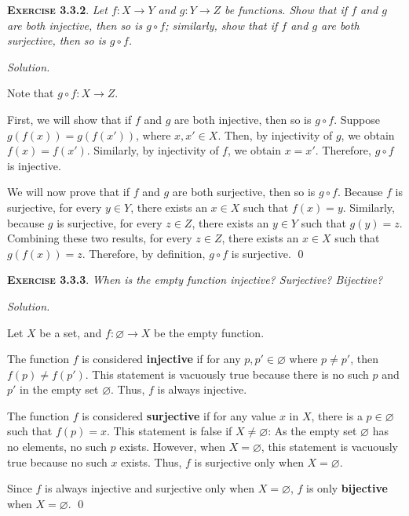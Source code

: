 \documentclass[12pt]{article}
\theoremstyle{remark}
\newenvironment{exer}[2]{
    \noindent \setlength{\parskip}{1em}%
    \textsc{\textbf{Exercise #1}}. \textit{#2} \par
    \noindent \textit{Solution.} %
}{\bigskip}
\begin{document}
\begin{exer}{3.3.2}{
    Let $f : X \to Y$ and $g : Y \to Z$ be functions.
    Show that if $f$ and $g$ are both injective, then so is $g \circ f$;
    similarly, show that if $f$ and $g$ are both surjective, then so is $g \circ f$.
}
    Note that $g \circ f : X \to Z$.
    
    First, we will show that if $f$ and $g$ are both injective, then so is $g \circ f$.
    Suppose $g(f(x)) = g(f(x'))$, where $x, x' \in X$.
    Then, by injectivity of $g$, we obtain $f(x) = f(x')$.
    Similarly, by injectivity of $f$, we obtain $x = x'$.
    Therefore, $g \circ f$ is injective.

    We will now prove that if $f$ and $g$ are both surjective, then so is $g \circ f$.
    Because $f$ is surjective, for every $y \in Y$, there exists an $x \in X$ such that $f(x) = y$.
    Similarly, because $g$ is surjective, for every $z \in Z$, there exists an $y \in Y$ such that $g(y) = z$.
    Combining these two results, for every $z \in Z$, there exists an $x \in X$ such that $g(f(x)) = z$.
    Therefore, by definition, $g \circ f$ is surjective. \qed
\end{exer}


\begin{exer}{3.3.3}{
    When is the empty function injective? Surjective? Bijective?
}
    Let $X$ be a set, and $f : \varnothing \to X$ be the empty function.

    The function $f$ is considered \textbf{injective} if for any $p, p' \in \varnothing$ where $p \ne p'$, then $f(p) \ne f(p')$.
    This statement is vacuously true because there is no such $p$ and $p'$ in the empty set $\varnothing$.
    Thus, $f$ is always injective.

    The function $f$ is considered \textbf{surjective} if for any value $x$ in $X$, there is a $p \in \varnothing$ such that $f(p) = x$.
    This statement is false if $X \ne \varnothing$: As the empty set $\varnothing$ has no elements, no such $p$ exists.
    However, when $X = \varnothing$, this statement is vacuously true because no such $x$ exists.
    Thus, $f$ is surjective only when $X = \varnothing$.

    Since $f$ is always injective and surjective only when $X = \varnothing$, $f$ is only \textbf{bijective} when $X = \varnothing$. \qed
\end{exer}
\end{document}
